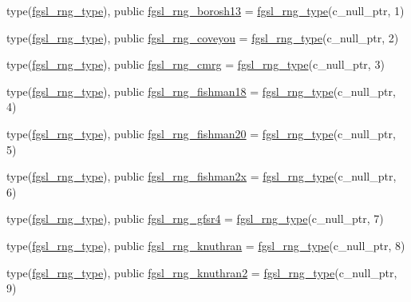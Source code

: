 \begin{DoxyCompactItemize}
\item 
type(\hyperlink{structfgsl_1_1fgsl__rng__type}{fgsl\+\_\+rng\+\_\+type}), public \hyperlink{namespacefgsl_afcf3a859944205f1a11e0dc35e13e608}{fgsl\+\_\+rng\+\_\+borosh13} = \hyperlink{structfgsl_1_1fgsl__rng__type}{fgsl\+\_\+rng\+\_\+type}(c\+\_\+null\+\_\+ptr, 1)
\item 
type(\hyperlink{structfgsl_1_1fgsl__rng__type}{fgsl\+\_\+rng\+\_\+type}), public \hyperlink{namespacefgsl_a8eb316ba1f0e42680fb05bf4444f3018}{fgsl\+\_\+rng\+\_\+coveyou} = \hyperlink{structfgsl_1_1fgsl__rng__type}{fgsl\+\_\+rng\+\_\+type}(c\+\_\+null\+\_\+ptr, 2)
\item 
type(\hyperlink{structfgsl_1_1fgsl__rng__type}{fgsl\+\_\+rng\+\_\+type}), public \hyperlink{namespacefgsl_a46ec4ab895207c6e3da1a2adb29bb0ff}{fgsl\+\_\+rng\+\_\+cmrg} = \hyperlink{structfgsl_1_1fgsl__rng__type}{fgsl\+\_\+rng\+\_\+type}(c\+\_\+null\+\_\+ptr, 3)
\item 
type(\hyperlink{structfgsl_1_1fgsl__rng__type}{fgsl\+\_\+rng\+\_\+type}), public \hyperlink{namespacefgsl_a8f22f1b0b7e5d37d485553834c96b959}{fgsl\+\_\+rng\+\_\+fishman18} = \hyperlink{structfgsl_1_1fgsl__rng__type}{fgsl\+\_\+rng\+\_\+type}(c\+\_\+null\+\_\+ptr, 4)
\item 
type(\hyperlink{structfgsl_1_1fgsl__rng__type}{fgsl\+\_\+rng\+\_\+type}), public \hyperlink{namespacefgsl_aaa1400ecb0b7757a72553cd766ac5880}{fgsl\+\_\+rng\+\_\+fishman20} = \hyperlink{structfgsl_1_1fgsl__rng__type}{fgsl\+\_\+rng\+\_\+type}(c\+\_\+null\+\_\+ptr, 5)
\item 
type(\hyperlink{structfgsl_1_1fgsl__rng__type}{fgsl\+\_\+rng\+\_\+type}), public \hyperlink{namespacefgsl_a6564b2d833a35c41a82dc834f2cc3263}{fgsl\+\_\+rng\+\_\+fishman2x} = \hyperlink{structfgsl_1_1fgsl__rng__type}{fgsl\+\_\+rng\+\_\+type}(c\+\_\+null\+\_\+ptr, 6)
\item 
type(\hyperlink{structfgsl_1_1fgsl__rng__type}{fgsl\+\_\+rng\+\_\+type}), public \hyperlink{namespacefgsl_a12158a5916e899c6bf9c9ceee7352105}{fgsl\+\_\+rng\+\_\+gfsr4} = \hyperlink{structfgsl_1_1fgsl__rng__type}{fgsl\+\_\+rng\+\_\+type}(c\+\_\+null\+\_\+ptr, 7)
\item 
type(\hyperlink{structfgsl_1_1fgsl__rng__type}{fgsl\+\_\+rng\+\_\+type}), public \hyperlink{namespacefgsl_af73840b5889e5a54be83e7596d5973c0}{fgsl\+\_\+rng\+\_\+knuthran} = \hyperlink{structfgsl_1_1fgsl__rng__type}{fgsl\+\_\+rng\+\_\+type}(c\+\_\+null\+\_\+ptr, 8)
\item 
type(\hyperlink{structfgsl_1_1fgsl__rng__type}{fgsl\+\_\+rng\+\_\+type}), public \hyperlink{namespacefgsl_a528795b3607aafcfc90f8615237804fa}{fgsl\+\_\+rng\+\_\+knuthran2} = \hyperlink{structfgsl_1_1fgsl__rng__type}{fgsl\+\_\+rng\+\_\+type}(c\+\_\+null\+\_\+ptr, 9)

\end{DoxyCompactItemize}
